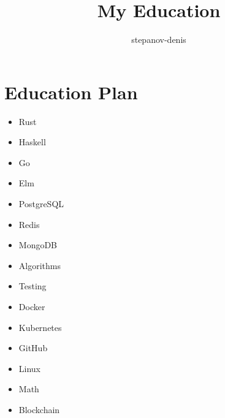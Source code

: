 \documentclass{article}
\title{My Education}
\author{stepanov-denis}
\begin{document}
\maketitle
\clearpage
\tableofcontents
\clearpage

\section{Education Plan}
\label{Education Plan}
\label{education-plan}
\begin{itemize}
\item Rust
\item Haskell
\item Go
\item Elm
\item PostgreSQL
\item Redis
\item MongoDB
\item Algorithms
\item Testing
\item Docker
\item Kubernetes
\item GitHub
\item Linux
\item Math
\item Blockchain
\end{itemize}
\end{document}
